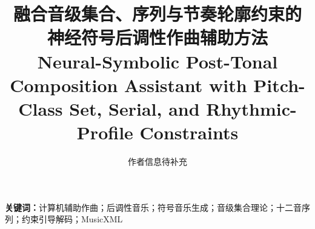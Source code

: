 \documentclass[11pt]{article}
\title{融合音级集合、序列与节奏轮廓约束的\\神经符号后调性作曲辅助方法\\[0.5em]
\large Neural-Symbolic Post-Tonal Composition Assistant with Pitch-Class Set, Serial, and Rhythmic-Profile Constraints}
\author{作者信息待补充}
\date{}
\begin{document}
\maketitle



\noindent\textbf{关键词：}计算机辅助作曲；后调性音乐；符号音乐生成；音级集合理论；十二音序列；约束引导解码；MusicXML

















\end{document}
